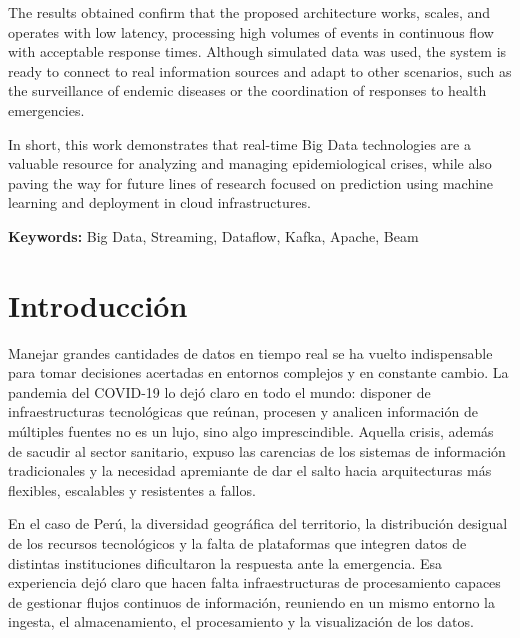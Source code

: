 \documentclass[12pt,a4paper]{article}
\begin{document}
The results obtained confirm that the proposed architecture works, scales, and operates with low latency, processing high volumes of events in continuous flow with acceptable response times. Although simulated data was used, the system is ready to connect to real information sources and adapt to other scenarios, such as the surveillance of endemic diseases or the coordination of responses to health emergencies.

In short, this work demonstrates that real-time Big Data technologies are a valuable resource for analyzing and managing epidemiological crises, while also paving the way for future lines of research focused on prediction using machine learning and deployment in cloud infrastructures.

\textbf{Keywords:} Big Data, Streaming, Dataflow, Kafka, Apache, Beam

\newpage

\tableofcontents
\newpage
\listoffigures
\newpage
\listoftables
\newpage


\section{Introducción}\label{introducciuxf3n}

Manejar grandes cantidades de datos en tiempo real se ha vuelto indispensable para tomar decisiones acertadas en entornos complejos y en constante cambio. La pandemia del COVID-19 lo dejó claro en todo el mundo: disponer de infraestructuras tecnológicas que reúnan, procesen y analicen información de múltiples fuentes no es un lujo, sino algo imprescindible. Aquella crisis, además de sacudir al sector sanitario, expuso las carencias de los sistemas de información tradicionales y la necesidad apremiante de dar el salto hacia arquitecturas más flexibles, escalables y resistentes a fallos.

En el caso de Perú, la diversidad geográfica del territorio, la distribución desigual de los recursos tecnológicos y la falta de plataformas que integren datos de distintas instituciones dificultaron la respuesta ante la emergencia. Esa experiencia dejó claro que hacen falta infraestructuras de procesamiento capaces de gestionar flujos continuos de información, reuniendo en un mismo entorno la ingesta, el almacenamiento, el procesamiento y la visualización de los datos.
\end{document}

